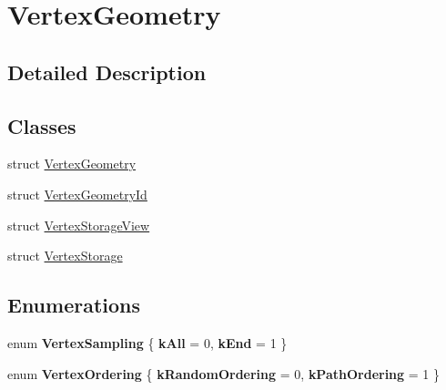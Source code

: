 \hypertarget{group___vertex_geometry}{}\section{Vertex\+Geometry}
\label{group___vertex_geometry}


\subsection{Detailed Description}
\subsection*{Classes}
\begin{DoxyCompactItemize}
\item 
struct \hyperlink{struct_vertex_geometry}{Vertex\+Geometry}
\item 
struct \hyperlink{struct_vertex_geometry_id}{Vertex\+Geometry\+Id}
\item 
struct \hyperlink{struct_vertex_storage_view}{Vertex\+Storage\+View}
\item 
struct \hyperlink{struct_vertex_storage}{Vertex\+Storage}
\end{DoxyCompactItemize}
\subsection*{Enumerations}
\begin{DoxyCompactItemize}
\item 
\mbox{\label{group___vertex_geometry_gae2642a40e812bd7932491151c40a1592}} 
enum {\bfseries Vertex\+Sampling} \{ {\bfseries k\+All} = 0, 
{\bfseries k\+End} = 1
 \}
\item 
\mbox{\label{group___vertex_geometry_ga6f628f5a47e70cc7301899aa1bd333da}} 
enum {\bfseries Vertex\+Ordering} \{ {\bfseries k\+Random\+Ordering} = 0, 
{\bfseries k\+Path\+Ordering} = 1
 \}
\end{DoxyCompactItemize}
